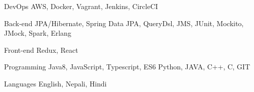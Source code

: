 

\begin{cvskills}

  \cvskill
    {DevOps} %
    {AWS, Docker, Vagrant, Jenkins, CircleCI} %

  \cvskill
    {Back-end} %
    {JPA/Hibernate, Spring Data JPA, QueryDsl, JMS, JUnit, Mockito, JMock, Spark, Erlang} %

  \cvskill
    {Front-end} %
    {Redux, React} %

  \cvskill
    {Programming} %
    {Java8, JavaScript, Typescript, ES6 Python, JAVA, C++, C, GIT} %

  \cvskill
    {Languages} %
    {English, Nepali, Hindi} %

\end{cvskills}
